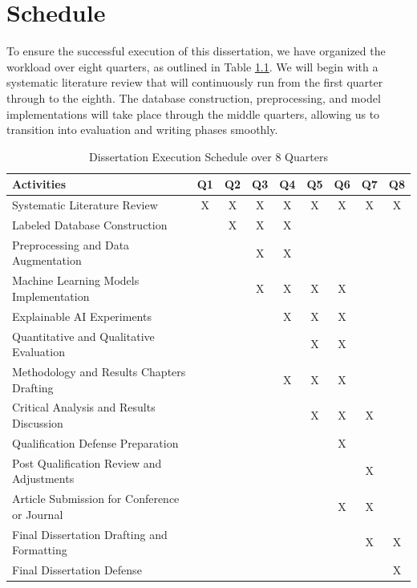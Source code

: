 \chapter{Schedule}\label{chap:schedule}

To ensure the successful execution of this dissertation, we have organized the workload over eight quarters, as outlined in Table \ref{tab:schedule}. We will begin with a systematic literature review that will continuously run from the first quarter through to the eighth. The database construction, preprocessing, and model implementations will take place through the middle quarters, allowing us to transition into evaluation and writing phases smoothly.

\begin{table}[htb]
    \centering
    \caption{Dissertation Execution Schedule over 8 Quarters}
    \label{tab:schedule}
    \begin{tabular}{p{5.5cm} *{8}{c}}
        \toprule
        Activities & Q1 & Q2 & Q3 & Q4 & Q5 & Q6 & Q7 & Q8 \\
        \midrule
        Systematic Literature Review & X & X & X & X & X & X & X & X \\
        \addlinespace
        Labeled Database Construction &  & X & X & X &  &  &  &  \\
        \addlinespace
        Preprocessing and Data Augmentation &  &  & X & X &  &  &  &  \\
        \addlinespace
        Machine Learning Models Implementation &  &  & X & X & X & X &  &  \\
        \addlinespace
        Explainable AI Experiments &  &  &  & X & X & X &  &  \\
        \addlinespace
        Quantitative and Qualitative Evaluation &  &  &  &  & X & X &  &  \\
        \addlinespace
        \midrule
        Methodology and Results Chapters Drafting &  &  &  & X & X & X &  &  \\
        \addlinespace
        Critical Analysis and Results Discussion &  &  &  &  & X & X & X &  \\
        \addlinespace
        Qualification Defense Preparation &  &  &  &  &  & X &  &  \\
        \addlinespace
        Post Qualification Review and Adjustments &  &  &  &  &  &  & X &  \\
        \addlinespace
        Article Submission for Conference or Journal &  &  &  &  &  & X & X &  \\
        \addlinespace
        Final Dissertation Drafting and Formatting &  &  &  &  &  &  & X & X \\
        \addlinespace
        Final Dissertation Defense &  &  &  &  &  &  &  & X \\
        \bottomrule
    \end{tabular}
\end{table}
